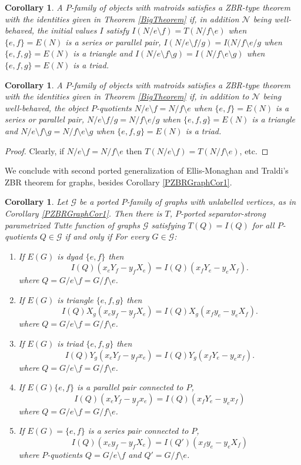 \documentclass[12pt,leqno]{amsart}
\newtheorem{cor}[lem]{Corollary}
\theoremstyle{remark}
\begin{document}
\begin{cor}
\label{IVEqualSerParCor}
A $P$-family of objects with matroids satisfies a ZBR-type theorem
with the identities given in Theorem \ref{BigTheorem} if, 
in 
addition $\mathcal{N}$ being well-behaved,
the initial values $I$ satisfy
$I(N/e\setminus f)=T(N/f\setminus e)$ when $\{e,f\}=E(N)$ is a series
or parallel pair,
$I(N/e\setminus f/g)=I(N/f\setminus e/g$ when $\{e,f,g\}=E(N)$ is a 
triangle and 
$I(N/e\setminus f\setminus g)=I(N/f\setminus e\setminus g)$ 
when $\{e,f,g\}=E(N)$ 
is a triad.
\end{cor}


\begin{cor}
A $P$-family of objects with matroids satisfies a ZBR-type theorem
with the identities given in Theorem \ref{BigTheorem} if, in 
addition to $\mathcal{N}$ being well-behaved,
the object $P$-quotients 
$N/e\setminus f=N/f\setminus e$ when $\{e,f\}=E(N)$ is a series
or parallel pair,
$N/e\setminus f/g=N/f\setminus e/g$ when $\{e,f,g\}=E(N)$ is a 
triangle and 
$N/e\setminus f\setminus g=N/f\setminus e\setminus g$ when $\{e,f,g\}=E(N)$ 
is a triad.
\end{cor}

\begin{proof}
Clearly, if $N/e\setminus f=N/f\setminus e$ then 
$T(N/e\setminus f)=T(N/f\setminus e)$, etc.
\end{proof}

We conclude with second ported generalization of 
Ellis-Monaghan and Traldi's ZBR theorem for graphs,
besides Corollary \ref{PZBRGraphCor1}.

\begin{cor}
\label{PZBRGraphCor2}
Let $\mathcal{G}$ be a ported $P$-family of graphs with
unlabelled vertices, as in Corollary \ref{PZBRGraphCor1}.
Then there is $T$, $P$-ported separator-strong parametrized Tutte function
of graphs $\mathcal{G}$ satisfying $T(Q)=I(Q)$ 
for all $P$-quotients $Q\in\mathcal{G}$ if and only if 
For every $G\in\mathcal{G}$:
\begin{enumerate}
\item 
If $E(G)$ is dyad $\{e,f\}$ then
\[
I(Q)(x_e Y_f - y_f X_e ) = 
I(Q)(x_f Y_e - y_e X_f).
\]
where $Q=G/e\setminus f=G/f\setminus e$.
\item
If $E(G)$ is triangle $\{e,f,g\}$ then
\[
I(Q)X_g(x_e y_f - y_f X_e ) = 
I(Q)X_g(x_f y_e - y_e X_f ).
\]
where $Q=G/e\setminus f=G/f\setminus e$.
\item
If $E(G)$ is triad $\{e,f,g\}$ then
\[
I(Q)Y_g(x_e Y_f - y_f x_e) = 
I(Q)Y_g(x_f Y_e - y_e x_f).
\]
where $Q=G/e\setminus f=G/f\setminus e$.
\item
If $E(G)\{e,f\}$ is a parallel pair connected to $P$, 
\[
I(Q)(x_e Y_f - y_f x_e) = 
I(Q)(x_f Y_e - y_e x_f)
\]
where $Q=G/e\setminus f=G/f\setminus e$.
\item
If $E(G)=\{e,f\}$ is a series pair connected to $P$, 
\[
I(Q)(x_e y_f - y_f X_e) = 
I(Q')(x_f y_e - y_e X_f)
\]
where $P$-quotients
$Q=G/e\setminus f$ 
and $Q'=G/f\setminus e$.
\end{enumerate}
\end{cor}
\end{document}
